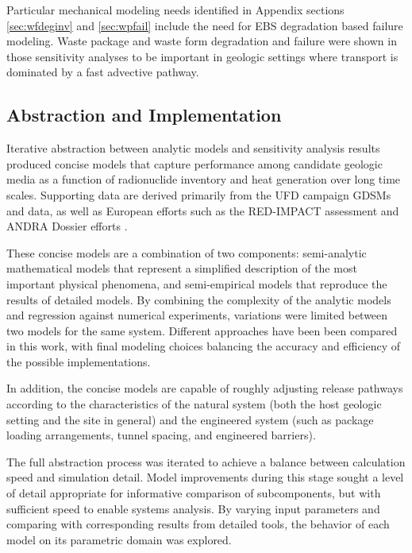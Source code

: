 Particular mechanical modeling needs identified in Appendix sections 
\ref{sec:wfdeginv} and \ref{sec:wpfail} include the need for \gls{EBS} 
degradation based failure modeling. Waste package and waste form degradation 
and failure were shown in those sensitivity analyses to be important in 
geologic settings where transport is dominated by a fast advective pathway. 

\subsection{Abstraction and Implementation}


Iterative abstraction between analytic models and sensitivity analysis results 
produced concise models that capture performance among candidate geologic media 
as a function of radionuclide inventory and heat generation over long time 
scales. Supporting data are derived primarily from the \gls{UFD} campaign 
\glspl{GDSM} and data, as well as European efforts such as the RED-IMPACT 
assessment and \gls{ANDRA} Dossier efforts \cite{von_lensa_red-impact_2008, 
andra_argile:_2005, clayton_generic_2011} . 


These concise models are a combination of two components: 
semi-analytic mathematical models that represent a simplified description of 
the most important physical phenomena, and semi-empirical models that reproduce 
the results of detailed models.  By combining the complexity of the analytic 
models and regression against numerical experiments, variations were limited 
between two models for the same system.  Different approaches have been been 
compared in this work, with final modeling choices balancing the accuracy and 
efficiency of the possible implementations.  

In addition, the concise models are capable of roughly adjusting release 
pathways according to the characteristics of the natural system (both the host 
geologic setting and the site in general) and the engineered system (such as package 
loading arrangements, tunnel spacing, and engineered barriers).

The full abstraction process was iterated to achieve a balance between 
calculation speed and simulation detail. Model improvements during this stage 
sought a level of detail appropriate for informative comparison of subcomponents, but 
with sufficient speed to enable systems analysis. 
By varying input parameters and comparing with corresponding results from 
detailed tools, the behavior of each model on its parametric domain was 
explored.

